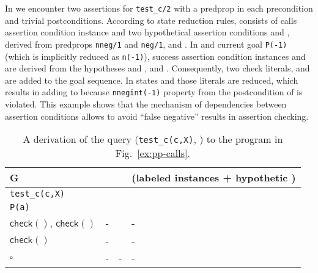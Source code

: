 \documentclass{llncs}
\newcommand{\kbd}[1]{\mbox{\tt #1}}
\newcommand{\skbd}[1]{\mbox{\tt\small{#1}}}
\newcommand{\emptyGoal}{\ensuremath{\square}}
\newcommand{\checkLitLab}[1]{\ensuremath{\textsf{check}(#1)}}
\begin{document}
In   we encounter two assertions for
\kbd{test\_c/2} with a predprop in each precondition and trivial
postconditions.
According to state reduction rules,  consists of calls
assertion condition instance  and two hypothetical
assertion conditions  and , derived from
predprops \skbd{nneg/1} and \skbd{neg/1}, and .
In  and current goal \kbd{P(-1)} (which is
implicitly reduced as \kbd{n(-1)}), success assertion condition
instances  and  are derived from the hypotheses
 and , and .
Consequently, two check literals,  and
 are added to the goal sequence.
In states  and  those literals
are reduced, which results in adding  to 
because \skbd{nnegint(-1)} property from the postcondition of
 is violated.
This example shows that the mechanism of dependencies between
assertion conditions allows to avoid ``false negative'' results in
assertion checking.

\begin{table}[h]
  \caption{A derivation of the query (\kbd{test\_c(c,X)}, ) to
    the program in Fig.~\ref{ex:pp-calls}.}
  \begin{minipage}{\textwidth}
    \small
    \begin{tabular}{p{}|p{}p{}p{}}
      \hline
      G         
          &   
          &  
          & (labeled instances + hypothetic )
      \\ \hline
      {\tt test\_c(c,X)}     
          & \newline
            \newline
                
          & \newline
            
          & \newline
            \newline
            
      \\ \hline
      {\tt P(a)} 
          &          
          & \newline
            
          & \newline
             
      \\ \hline
      \checkLitLab{},\newline
      \checkLitLab{}        
          & -       
          & 
          & -
      \\ \hline
      \checkLitLab{} 
          & -          
          & 
          & -
      \\ \hline 
      \emptyGoal
         & -
         & -
         & -
      \\ \hline
    \end{tabular}
  \end{minipage}
  \label{tbl:test2}  
\end{table}
\end{document}
